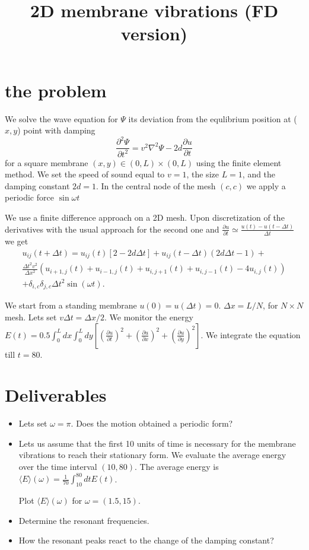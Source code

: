 \documentclass[7pt]{article}
\title{2D membrane vibrations (FD version)}
\begin{document}
\maketitle




\section{the problem}


We solve the wave equation for $\Psi$ its deviation from the equlibrium position at ($x,y$) point
with damping 
\begin{equation} \frac{\partial^2 \Psi}{\partial t^2}=v^2\nabla^2\Psi -2d\frac{\partial u}{\partial t}\end{equation}
for a square membrane $(x,y)\in(0,L)\times(0,L)$ using the finite element method. We set the speed of sound equal to $v=1$, the size $L=1$,
and the damping constant $2d=1$. In the central node of the mesh $(c,c)$ we apply a periodic force $\sin\omega t$

We use a finite difference approach on a 2D mesh. 
Upon discretization of the derivatives with the usual approach for the second one and $\frac{\partial u}{\partial t}\simeq \frac{u(t)-u(t-\Delta t)}{\Delta t}$
we get 
\begin{eqnarray}
u_{ij}(t+\Delta t)=u_{ij}(t)[2-2d \Delta t]+u_{ij}(t-\Delta t)(2d \Delta t -1)+\\\frac{\Delta t^2 v^2}{\Delta x^2}(u_{i+1,j}(t)+u_{i-1,j}(t)+u_{i,j+1}(t)+u_{i,j-1}(t)-4u_{i,j}(t)) \\
+\delta_{i,c}\delta_{j,c}\Delta t^2\sin(\omega t).
\end{eqnarray}

We start from a standing membrane $u(0)=u(\Delta t)=0$. 
$\Delta x=L/N$, for $N\times N$ mesh. Lets set $v\Delta t=\Delta x/2$.
We monitor the energy $E(t)=0.5\int_0^Ldx\int_0^Ldy\left[(\frac{\partial u}{\partial t})^2+(\frac{\partial u}{\partial x})^2+(\frac{\partial u}{\partial y})^2\right]$.
We integrate the equation till $t=80$. 

\section{Deliverables}
\begin{itemize} \item
Lets set $\omega=\pi$. Does the motion obtained a periodic form?
\item 
Lets us assume that the first 10 units of time is necessary for the membrane vibrations to reach their stationary form.
We evaluate the average energy over the time interval $(10,80)$.
The average energy is $\langle E \rangle(\omega)=\frac{1}{70} \int_{10}^{80} dt E(t)$.

Plot $\langle E \rangle(\omega)$ for $\omega=(1.5,15)$.
\item Determine the resonant frequencies.
\item How the resonant peaks react to the change of the damping constant?
\end{itemize}
\end{document}
